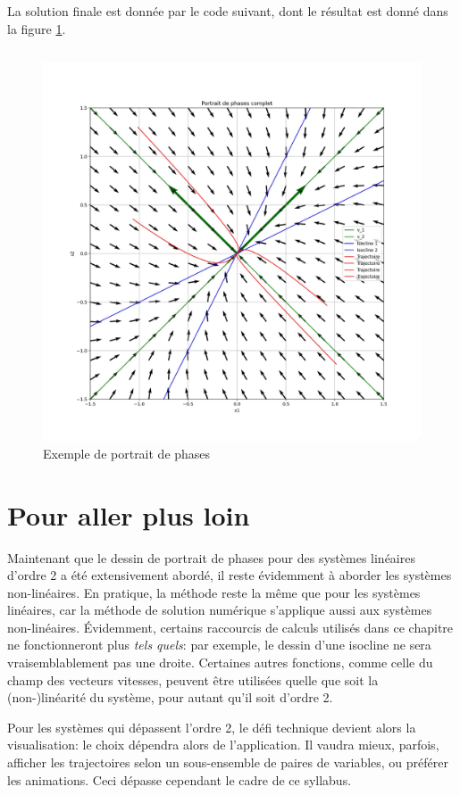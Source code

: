                 La solution finale est donnée par le code suivant, dont le résultat est donné dans la figure \ref{fig:portrait_de_phases}.
                \inputminted{python}{codes/portrait_de_phases.py}
                \begin{figure}[ht!]
                    \centering
                    \includegraphics[width=\textwidth]{images/portrait_de_phases.jpg}
                    \caption{Exemple de portrait de phases}
                    \label{fig:portrait_de_phases}
                \end{figure}
    \section{Pour aller plus loin}
        Maintenant que le dessin de portrait de phases pour des systèmes linéaires d'ordre 2 a été extensivement abordé, il reste évidemment à aborder les systèmes non-linéaires. En pratique, la méthode reste la même que pour les systèmes linéaires, car la méthode de solution numérique s'applique aussi aux systèmes non-linéaires. Évidemment, certains raccourcis de calculs utilisés dans ce chapitre ne fonctionneront plus \textit{tels quels}: par exemple, le dessin d'une isocline ne sera vraisemblablement pas une droite. Certaines autres fonctions, comme celle du champ des vecteurs vitesses, peuvent être utilisées quelle que soit la (non-)linéarité du système, pour autant qu'il soit d'ordre 2.

        Pour les systèmes qui dépassent l'ordre 2, le défi technique devient alors la visualisation: le choix dépendra alors de l'application. Il vaudra mieux, parfois, afficher les trajectoires selon un sous-ensemble de paires de variables, ou préférer les animations. Ceci dépasse cependant le cadre de ce syllabus.
